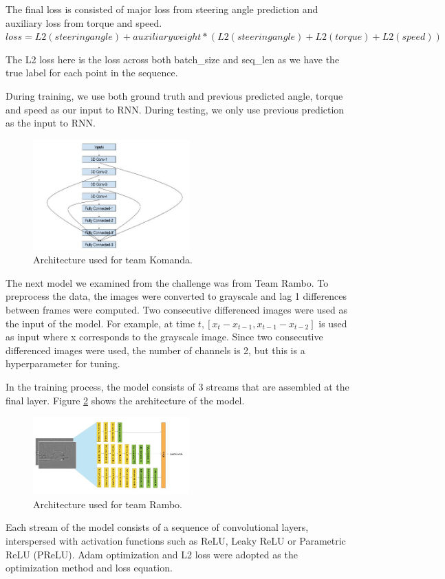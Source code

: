 \documentclass[10pt,twocolumn,letterpaper]{article}
\begin{document}
The final loss is consisted of major loss from steering angle prediction and auxiliary loss from torque and speed. 
$loss=L2(steering angle)+auxiliary weight*(L2(steering angle)+L2(torque)+L2(speed))$

The L2 loss here is the loss across both batch\_size and seq\_len as we have the true label for each point in the sequence.

During training, we use both ground truth and previous predicted angle, torque and speed as our input to RNN. During testing, we only use previous prediction as the input to RNN.
\begin{figure}[!htb]
	\includegraphics[width=6cm]{Komanda.JPG}
	\centering
	\caption{Architecture used for team Komanda.}
	\label{komanda}
\end{figure}

The next model we examined from the challenge was from Team Rambo. To preprocess the data, the images were converted to grayscale and lag 1 differences between frames were computed. Two consecutive differenced images were used as the input of the model. For example, at time $t, [x_{t} - x_{t-1}, x_{t-1} - x_{t-2}]$ is used as input where x corresponds to the grayscale image. Since two consecutive differenced images were used, the number of channels is 2, but this is a hyperparameter for tuning. 

In the training process, the model consists of 3 streams that are assembled at the final layer. Figure \ref{rambo} shows the architecture of the model. 
\begin{figure}[!htb]
	\includegraphics[width=6cm]{rambo.JPG}
	\centering
	\caption{Architecture used for team Rambo.}
	\label{rambo}
\end{figure}
Each stream of the model consists of a sequence of convolutional layers, interspersed with activation functions such as ReLU, Leaky ReLU or Parametric ReLU (PReLU). Adam optimization and L2 loss were adopted as the optimization method and loss equation.
\end{document}
